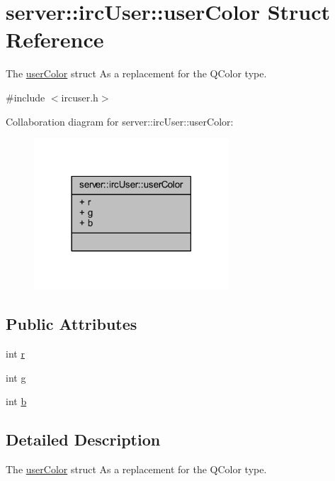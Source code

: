 \hypertarget{structserver_1_1irc_user_1_1user_color}{\section{server\-:\-:irc\-User\-:\-:user\-Color Struct Reference}
\label{db/d31/structserver_1_1irc_user_1_1user_color}
}


The \hyperlink{structserver_1_1irc_user_1_1user_color}{user\-Color} struct As a replacement for the Q\-Color type.  




{\ttfamily \#include $<$ircuser.\-h$>$}



Collaboration diagram for server\-:\-:irc\-User\-:\-:user\-Color\-:\nopagebreak
\begin{figure}[H]
\begin{center}
\leavevmode
\includegraphics[width=206pt]{d2/dd2/structserver_1_1irc_user_1_1user_color__coll__graph}
\end{center}
\end{figure}
\subsection*{Public Attributes}
\begin{DoxyCompactItemize}
\item 
int \hyperlink{structserver_1_1irc_user_1_1user_color_abe837948b8877eb7faa9b229037b3af2}{r}
\item 
int \hyperlink{structserver_1_1irc_user_1_1user_color_ab72c5a2e0c09cd2ea5ef195cb4edd3ae}{g}
\item 
int \hyperlink{structserver_1_1irc_user_1_1user_color_a908b1b071395653458048d5b84de460f}{b}
\end{DoxyCompactItemize}


\subsection{Detailed Description}
The \hyperlink{structserver_1_1irc_user_1_1user_color}{user\-Color} struct As a replacement for the Q\-Color type. 

